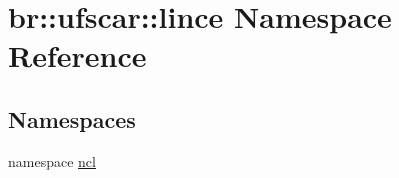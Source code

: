 \hypertarget{namespacebr_1_1ufscar_1_1lince}{
\section{br::ufscar::lince Namespace Reference}
\label{namespacebr_1_1ufscar_1_1lince}
}
\subsection*{Namespaces}
\begin{DoxyCompactItemize}
\item 
namespace \hyperlink{namespacebr_1_1ufscar_1_1lince_1_1ncl}{ncl}
\end{DoxyCompactItemize}
